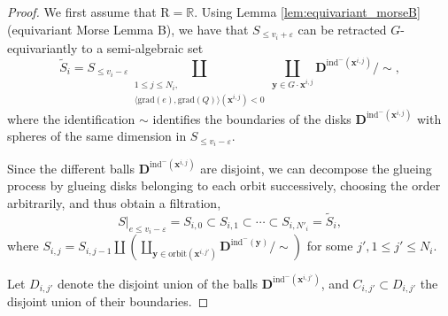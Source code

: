 \documentclass{amsart}
\theoremstyle{definition}
\theoremstyle{remark}
\numberwithin{equation}{section}
\begin{document}
\begin{proof}
We first assume that ${\mathrm{R}} = \mathbb{R}$.
Using Lemma \ref{lem:equivariant_morseB} (equivariant Morse Lemma B), we have that 
$S_{\leq v_i +{{\varepsilon}}}$ can be retracted $G$-equivariantly to a 
semi-algebraic set
\[
\tilde{S}_i = S_{\leq v_i -{{\varepsilon}}} \coprod_{\substack{1 \leq j \leq N_i,\\
 \langle{\mathrm{grad}} (e), {\mathrm{grad}}(Q)\rangle({\mathbf{x}}^{i,j}) < 0}}
\coprod_{{\mathbf{y}} \in G \cdot {\mathbf{x}}^{i,j}} \mathbf{D}^{{\mathrm{ind}}^-({\mathbf{x}}^{i,j})}/\sim,
\]
where the identification $\sim$ identifies the boundaries of the disks
$\mathbf{D}^{{\mathrm{ind}}^-({\mathbf{x}}^{i,j})}$ with spheres of the same dimension in  
$S_{\leq v_i -{{\varepsilon}}}$.

Since the different balls $\mathbf{D}^{{\mathrm{ind}}^-({\mathbf{x}}^{i,j})}$ are disjoint, we can decompose the 
glueing process by glueing disks belonging to each orbit successively,  
choosing the order arbitrarily, and thus obtain a filtration,
\[
 S|_{e \leq v_i -{{\varepsilon}}}=S_{i,0} \subset S_{i,1} \subset \cdots  \subset S_{i,N'_i} = \tilde{S}_i,
\]
where $S_{i,j} = S_{i,j-1} \coprod \left(\coprod_{{\mathbf{y}} \in {\mathrm{orbit}}( {\mathbf{x}}^{i,j'})}
 \mathbf{D}^{{\mathrm{ind}}^-({\mathbf{y}})}/\sim\right)$ for some $j', 1 \leq j' \leq N_i$.
 
 Let $D_{i,j'}$ denote the disjoint union of the balls $\mathbf{D}^{{\mathrm{ind}}^-({\mathbf{x}}^{i,j'})}$, and 
 $C_{i,j'} \subset D_{i,j'}$ the disjoint union of their boundaries.
 

\end{proof}
\end{document}

